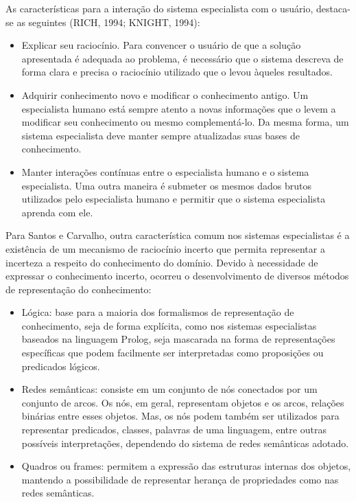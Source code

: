 As características para a interação do sistema especialista com o usuário, destaca-se as seguintes (RICH, 1994; KNIGHT, 1994): 
\begin{itemize}
	\item Explicar seu raciocínio. Para convencer o usuário de que a solução apresentada é adequada ao problema, é necessário que o sistema descreva de forma clara e precisa o raciocínio utilizado que o levou àqueles resultados. 
	
	\item Adquirir conhecimento novo e modificar o conhecimento antigo. Um especialista humano está sempre atento a novas informações que o levem a modificar seu conhecimento ou mesmo complementá-lo. Da mesma forma, um sistema especialista deve manter sempre atualizadas suas bases de conhecimento. 
	
	\item Manter interações contínuas entre o especialista humano e o sistema especialista. Uma outra maneira é submeter os mesmos dados brutos utilizados pelo especialista humano e permitir que o sistema especialista aprenda com ele. 
	
\end{itemize}

Para Santos e Carvalho, outra característica comum nos sistemas especialistas é a existência de um mecanismo de raciocínio incerto que permita representar a incerteza a respeito do conhecimento do domínio. Devido à necessidade de expressar o conhecimento incerto, ocorreu o desenvolvimento de diversos métodos de representação do conhecimento: 

\begin{itemize}
	\item Lógica: base para a maioria dos formalismos de representação de conhecimento, seja de forma explícita, como nos sistemas especialistas baseados na linguagem Prolog, seja mascarada na forma de representações específicas que podem facilmente ser interpretadas como proposições ou predicados lógicos. 
	
	\item Redes semânticas: consiste em um conjunto de nós conectados por um conjunto de arcos. Os nós, em geral, representam objetos e os arcos, relações binárias entre esses objetos. Mas, os nós podem também ser utilizados para representar predicados, classes, palavras de uma linguagem, entre outras possíveis interpretações, dependendo do sistema de redes semânticas adotado. 
	
	\item Quadros ou frames: permitem a expressão das estruturas internas dos objetos, mantendo a possibilidade de representar herança de propriedades como nas redes semânticas.
\end{itemize}


